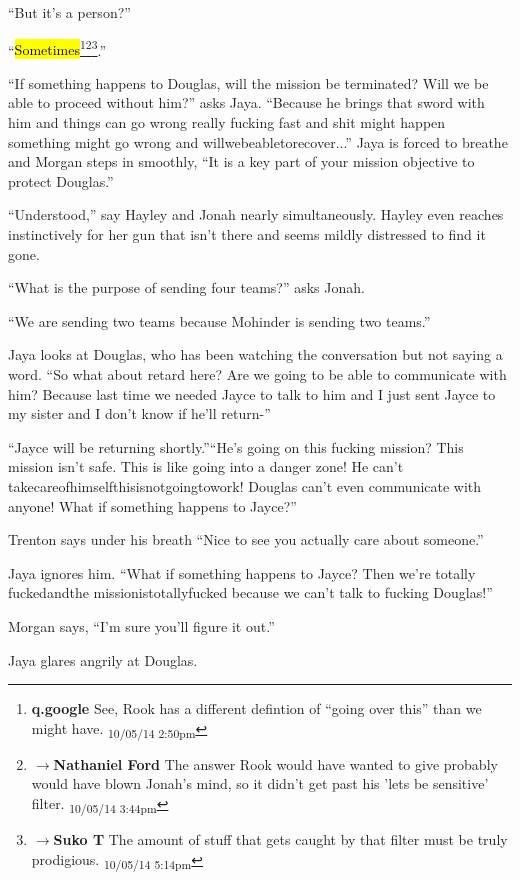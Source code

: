 ``But it's a person?''

``\hl{Sometimes}\footnote{\textbf{q.google }See, Rook has a different defintion of ``going over this'' than we might have. \textsubscript{10/05/14 2:50pm}}\footnote{$\rightarrow$\textbf{Nathaniel Ford }The answer Rook would have wanted to give probably would have blown Jonah's mind, so it didn't get past his 'lets be sensitive' filter. \textsubscript{10/05/14 3:44pm}}\footnote{$\rightarrow$\textbf{Suko T }The amount of stuff that gets caught by that filter must be truly prodigious. \textsubscript{10/05/14 5:14pm}}.''

``If something happens to Douglas, will the mission be terminated?  Will we be able to proceed without him?'' asks Jaya.  ``Because he brings that sword with him and things can go wrong really fucking fast and shit might happen something might go wrong and willwebeabletorecover...''  Jaya is forced to breathe and Morgan steps in smoothly, ``It is a key part of your mission objective to protect Douglas.''

``Understood,'' say Hayley and Jonah nearly simultaneously.  Hayley even reaches instinctively for her gun that isn't there and seems mildly distressed to find it gone.

``What is the purpose of sending four teams?'' asks Jonah.

``We are sending two teams because Mohinder is sending two teams.''

Jaya looks at Douglas, who has been watching the conversation but not saying a word.  ``So what about retard here?  Are we going to be able to communicate with him?  Because last time we needed Jayce to talk to him and I just sent Jayce to my sister and I don't know if he'll return-''

``Jayce will be returning shortly.''``He's going on this fucking mission?  This mission isn't safe.  This is like going into a danger zone!  He can't takecareofhimselfthisisnotgoingtowork!  Douglas can't even communicate with anyone!  What if something happens to Jayce?''

Trenton says under his breath ``Nice to see you actually care about someone.''  

Jaya ignores him.  ``What if something happens to Jayce?  Then we're totally fuckedandthe missionistotallyfucked because we can't talk to fucking Douglas!''

Morgan says, ``I'm sure you'll figure it out.''

Jaya glares angrily at Douglas.


